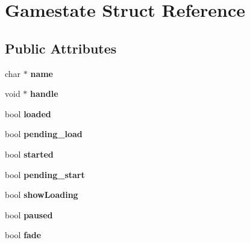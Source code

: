 \hypertarget{structGamestate}{\section{Gamestate Struct Reference}
\label{structGamestate}
}
\subsection*{Public Attributes}
\begin{DoxyCompactItemize}
\item 
\hypertarget{structGamestate_afe0dca76ed107e371404ef543fe6c10d}{char $\ast$ {\bfseries name}}\label{structGamestate_afe0dca76ed107e371404ef543fe6c10d}

\item 
\hypertarget{structGamestate_ad9af1233078e2761905817e5c7d09a86}{void $\ast$ {\bfseries handle}}\label{structGamestate_ad9af1233078e2761905817e5c7d09a86}

\item 
\hypertarget{structGamestate_ab9901b534dd036ccf36c049c661a1447}{bool {\bfseries loaded}}\label{structGamestate_ab9901b534dd036ccf36c049c661a1447}

\item 
\hypertarget{structGamestate_ae6097c3f6b7c24b9070d7677529da8e9}{bool {\bfseries pending\+\_\+load}}\label{structGamestate_ae6097c3f6b7c24b9070d7677529da8e9}

\item 
\hypertarget{structGamestate_a38cee08273dcd8398559db9b02bbd88f}{bool {\bfseries started}}\label{structGamestate_a38cee08273dcd8398559db9b02bbd88f}

\item 
\hypertarget{structGamestate_af66fd1a4cd78ac906d0042c522577fac}{bool {\bfseries pending\+\_\+start}}\label{structGamestate_af66fd1a4cd78ac906d0042c522577fac}

\item 
\hypertarget{structGamestate_a7ae9ea1490efd0f014a43f070e432155}{bool {\bfseries show\+Loading}}\label{structGamestate_a7ae9ea1490efd0f014a43f070e432155}

\item 
\hypertarget{structGamestate_adf037f12489ca725d9497e2c6743062e}{bool {\bfseries paused}}\label{structGamestate_adf037f12489ca725d9497e2c6743062e}

\item 
\hypertarget{structGamestate_a6fc2be3a512d48586695c49516b1c87d}{bool {\bfseries fade}}\label{structGamestate_a6fc2be3a512d48586695c49516b1c87d}


\end{DoxyCompactItemize}
